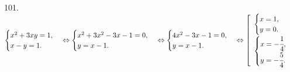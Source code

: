 101. $\begin{cases} x^2+3xy=1,\\ x-y=1.\end{cases}\Leftrightarrow\begin{cases} x^2+3x^2-3x-1=0,\\ y=x-1.\end{cases}\Leftrightarrow
\begin{cases} 4x^2-3x-1=0,\\ y=x-1.\end{cases}\Leftrightarrow\left[\begin{array}{l}\begin{cases} x=1,\\y=0.\end{cases}\\\begin{cases} x=-\cfrac{1}{4},\\y=-\cfrac{5}{4}.\end{cases}\end{array}\right.$\\
